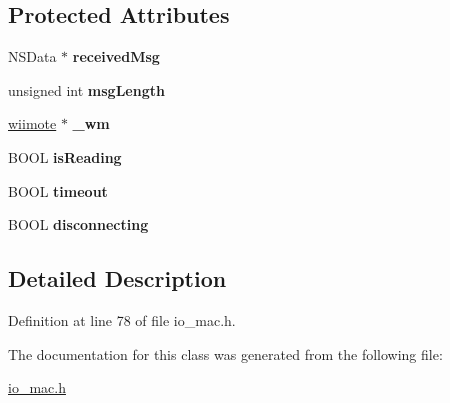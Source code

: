 \subsection*{\-Protected \-Attributes}
\begin{DoxyCompactItemize}
\item 
\hypertarget{interface_wii_connect_aec21ec9602201383bba36942cebb6011}{\-N\-S\-Data $\ast$ {\bfseries received\-Msg}}\label{interface_wii_connect_aec21ec9602201383bba36942cebb6011}

\item 
\hypertarget{interface_wii_connect_ac15cec89972ac285875a76e9f1576060}{unsigned int {\bfseries msg\-Length}}\label{interface_wii_connect_ac15cec89972ac285875a76e9f1576060}

\item 
\hypertarget{interface_wii_connect_aaf493501ef451d77d49546beec8c2db9}{\hyperlink{structwiimote__t}{wiimote} $\ast$ {\bfseries \-\_\-wm}}\label{interface_wii_connect_aaf493501ef451d77d49546beec8c2db9}

\item 
\hypertarget{interface_wii_connect_a578cdc47ce08accc0072b70dc99ac666}{\-B\-O\-O\-L {\bfseries is\-Reading}}\label{interface_wii_connect_a578cdc47ce08accc0072b70dc99ac666}

\item 
\hypertarget{interface_wii_connect_afcc5333eadf106d01476621373122418}{\-B\-O\-O\-L {\bfseries timeout}}\label{interface_wii_connect_afcc5333eadf106d01476621373122418}

\item 
\hypertarget{interface_wii_connect_aa6640f064f8d382d4612e200e14e06a8}{\-B\-O\-O\-L {\bfseries disconnecting}}\label{interface_wii_connect_aa6640f064f8d382d4612e200e14e06a8}

\end{DoxyCompactItemize}


\subsection{\-Detailed \-Description}


\-Definition at line 78 of file io\-\_\-mac.\-h.



\-The documentation for this class was generated from the following file\-:\begin{DoxyCompactItemize}
\item 
\hyperlink{io__mac_8h}{io\-\_\-mac.\-h}\end{DoxyCompactItemize}
